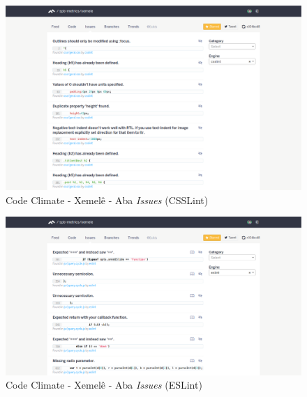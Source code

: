 \begin{figure}[!htb]
	\centering
    \includegraphics[keepaspectratio=true,scale=0.3]
    {figuras/codeclimate_issues_tab_csslint.eps}
  \caption{Code Climate - Xemelê - Aba \textit{Issues} (CSSLint)}
	\label{fig:codeclimate_issues_tab_csslint}
\end{figure}

\begin{figure}[!htb]
	\centering
    \includegraphics[keepaspectratio=true,scale=0.3]
    {figuras/codeclimate_issues_tab_eslint.eps}
  \caption{Code Climate - Xemelê - Aba \textit{Issues} (ESLint)}
	\label{fig:codeclimate_issues_tab_eslint}
\end{figure}

